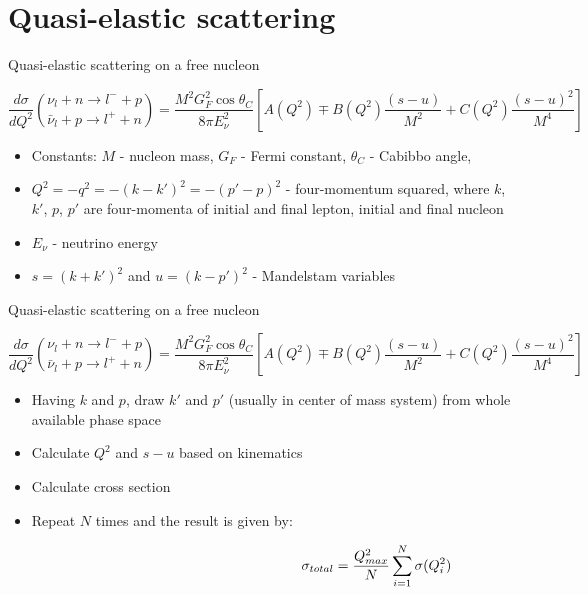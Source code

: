 \section{Quasi-elastic scattering}

\begin{wideslide}[toc=QEL on free N]{Quasi-elastic scattering on a free nucleon}
\null\vfill

  
  $$\frac{d\sigma}{dQ^2} {{\nu_l + n \rightarrow l^- + p}\choose{\bar\nu_l + p \rightarrow l^+ + n}} = \frac{M^2G_F^2\cos\theta_C}{8\pi E_\nu^2}\left[A(Q^2) \mp B(Q^2)\frac{(s - u)}{M^2} + C(Q^2)\frac{(s - u)^2}{M^4}\right]$$
  
  
  \begin{itemize}
    \item Constants: $M$ - nucleon mass, $G_F$ - Fermi constant, $\theta_C$ - Cabibbo angle,
    \item $Q^2 = -q^2 = - (k - k')^2 = - (p' - p)^2$ - four-momentum squared, where $k$, $k'$, $p$, $p'$ are four-momenta of initial and final lepton, initial and final nucleon
    \item $E_\nu$ - neutrino energy
    \item $s = (k + k')^2$ and $u = (k - p')^2$ - Mandelstam variables
  \end{itemize}

  
\vfill\null
\end{wideslide}

\begin{wideslide}[toc=]{Quasi-elastic scattering on a free nucleon}
\null\vfill

  
  $$\frac{d\sigma}{dQ^2} {{\nu_l + n \rightarrow l^- + p}\choose{\bar\nu_l + p \rightarrow l^+ + n}} = \frac{M^2G_F^2\cos\theta_C}{8\pi E_\nu^2}\left[A(Q^2) \mp B(Q^2)\frac{(s - u)}{M^2} + C(Q^2)\frac{(s - u)^2}{M^4}\right]$$
  
  
  \begin{itemize}
    \item Having $k$ and $p$, draw $k'$ and $p'$ (usually in center of mass system) from whole available phase space
    \item Calculate $Q^2$ and $s - u$ based on kinematics
    \item Calculate cross section
    \item Repeat $N$ times and the result is given by: 
    
    \vspace{-32pt}$$\hspace*{150pt}\sigma_{total} = \frac{Q^2_{max}}{N} \sum\limits_{i = 1}^N \sigma (Q_i^2)$$
    
  \end{itemize}

  
\vfill\null
\end{wideslide}
